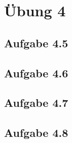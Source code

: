 \documentclass{standalone}
\begin{document}
 
\section{Übung 4}

\subsection{Aufgabe 4.5}

\subsection{Aufgabe 4.6}

\subsection{Aufgabe 4.7}

\subsection{Aufgabe 4.8}
\end{document}
